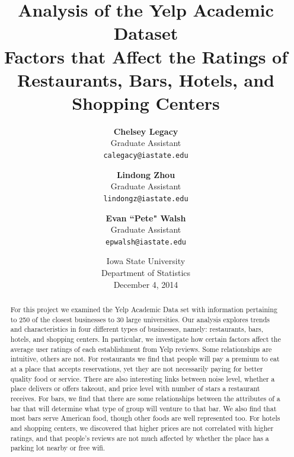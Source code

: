 \documentclass[11pt]{article}
\begin{document}
\title{
\textbf{Analysis of the Yelp Academic Dataset}\\
Factors that Affect the Ratings of Restaurants, Bars, Hotels, and Shopping Centers
}

\author{
\textbf{Chelsey Legacy} \\
Graduate Assistant \\
\texttt{calegacy@iastate.edu}
\and
\textbf{Lindong Zhou} \\
Graduate Assistant \\
\texttt{lindongz@iastate.edu}
\and
\textbf{Evan ``Pete" Walsh} \\
Graduate Assistant \\
\texttt{epwalsh@iastate.edu}
}

\date{
{\LARGE Iowa State University} \\
Department of Statistics \\
December 4, 2014}
\maketitle

\begin{abstract}
For this project we examined the Yelp Academic Data set with information pertaining to 250 of the closest businesses to 30 large universities. Our analysis explores trends and characteristics in four different types of businesses, namely: restaurants, bars, hotels, and shopping centers. In particular, we investigate how certain factors affect the average user ratings of each establishment from Yelp reviews. Some relationships are intuitive, others are not. For restaurants we find that people will pay a premium to eat at a place that accepts reservations, yet they are not necessarily paying for better quality food or service. There are also interesting links between noise level, whether a place delivers or offers takeout, and price level with number of stars a restaurant receives. For bars, we find that there are some relationships between the attributes of a bar that will determine what type of group will venture to that bar. We also find that most bars serve American food, though other foods are well represented too. For hotels and shopping centers, we discovered that higher prices are not correlated with higher ratings, and that people's reviews are not much affected by whether the place has a parking lot nearby or free wifi. 
\end{abstract}

\end{document}
